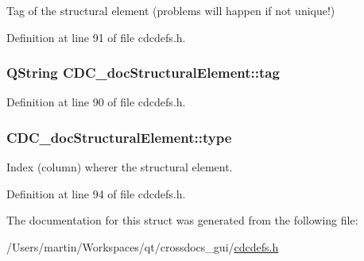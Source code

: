 Tag of the structural element (problems will happen if not unique!) 



Definition at line 91 of file cdcdefs.\+h.

\hypertarget{struct_c_d_c__doc_structural_element_a1c0b32fc629141e98cbbecc122290b5e}{
\subsubsection[{tag}]{\setlength{\rightskip}{0pt plus 5cm}Q\+String C\+D\+C\+\_\+doc\+Structural\+Element\+::tag}}\label{struct_c_d_c__doc_structural_element_a1c0b32fc629141e98cbbecc122290b5e}


Definition at line 90 of file cdcdefs.\+h.

\hypertarget{struct_c_d_c__doc_structural_element_a91d8e46c0feb18a294baababa4318f5e}{
\subsubsection[{type}]{ C\+D\+C\+\_\+doc\+Structural\+Element\+::type}}\label{struct_c_d_c__doc_structural_element_a91d8e46c0feb18a294baababa4318f5e}


Index (column) wherer the structural element. 



Definition at line 94 of file cdcdefs.\+h.



The documentation for this struct was generated from the following file\+:\begin{DoxyCompactItemize}
\item 
/\+Users/martin/\+Workspaces/qt/crossdocs\+\_\+gui/\hyperlink{cdcdefs_8h}{cdcdefs.\+h}\end{DoxyCompactItemize}

